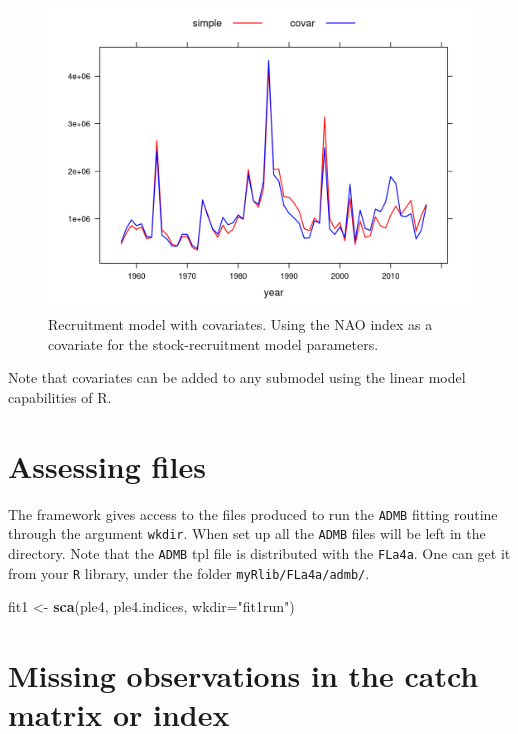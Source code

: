 \documentclass[
]{book}
\newenvironment{Shaded}{\begin{snugshade}}{\end{snugshade}}
\newcommand{\AttributeTok}[1]{\textcolor[rgb]{0.13,0.29,0.53}{#1}}
\newcommand{\FunctionTok}[1]{\textcolor[rgb]{0.13,0.29,0.53}{\textbf{#1}}}
\newcommand{\NormalTok}[1]{#1}
\newcommand{\OtherTok}[1]{\textcolor[rgb]{0.56,0.35,0.01}{#1}}
\newcommand{\StringTok}[1]{\textcolor[rgb]{0.31,0.60,0.02}{#1}}
\begin{document}
\begin{figure}
\centering
\includegraphics{_bookdown_files/_main_files/figure-html/naor2-1.png}
\caption{\label{fig:naor2}Recruitment model with covariates. Using the NAO index as a covariate for the stock-recruitment model parameters.}
\end{figure}

Note that covariates can be added to any submodel using the linear model capabilities of R.

\hypertarget{assessing-files}{%
\section{\texorpdfstring{Assessing \ADMB files}{Assessing files}}\label{assessing-files}}

The framework gives access to the files produced to run the \texttt{ADMB} fitting routine through the argument \texttt{wkdir}. When set up all the \texttt{ADMB} files will be left in the directory. Note that the \texttt{ADMB} tpl file is distributed with the \texttt{FLa4a}. One can get it from your \texttt{R} library, under the folder \texttt{myRlib/FLa4a/admb/}.

\begin{Shaded}
\begin{Highlighting}[]
\NormalTok{fit1 }\OtherTok{\textless{}{-}} \FunctionTok{sca}\NormalTok{(ple4, ple4.indices, }\AttributeTok{wkdir=}\StringTok{"fit1run"}\NormalTok{)}
\end{Highlighting}
\end{Shaded}

\hypertarget{missing-observations-in-the-catch-matrix-or-index}{%
\section{Missing observations in the catch matrix or index}\label{missing-observations-in-the-catch-matrix-or-index}}
\end{document}
